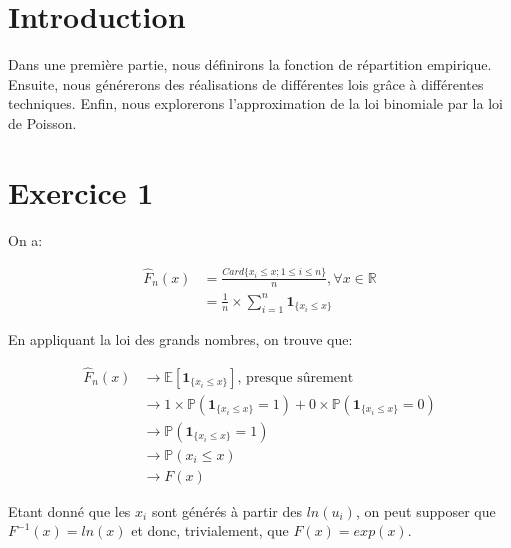 \documentclass{article}
\begin{document}
\begin{multicols}{2}

\section{Introduction}\label{sec:intro}

Dans une première partie, nous définirons la fonction de répartition empirique.
Ensuite, nous générerons des réalisations de différentes lois grâce à
différentes techniques. Enfin, nous explorerons l'approximation de la loi
binomiale par la loi de Poisson.


\section{Exercice 1}\label{sec:ex1}

On a:

\begin{equation}
    \begin{split}
        \hat{F}_n(x) &= \frac{Card\{x_i \leq x; 1 \leq i \leq n\}}{n}, \forall x \in \mathbb{R} \\
                     &= \frac{1}{n} \times \sum_{i = 1}^{n} \mathbf{1}_{\{x_i \leq x\}}
    \end{split}
\end{equation}

En appliquant la loi des grands nombres, on trouve que:

\begin{equation}
    \begin{split}
        \hat{F}_n(x) &\to \mathbb{E}[\mathbf{1}_{\{x_i \leq x\}}]\text{, presque sûrement}\\
                     &\to 1 \times \mathbb{P}(\mathbf{1}_{\{x_i \leq x\}} = 1) + 0 \times \mathbb{P}(\mathbf{1}_{\{x_i \leq x\}} = 0)\\
                     &\to \mathbb{P}(\mathbf{1}_{\{x_i \leq x\}} = 1)\\
                     &\to \mathbb{P}(x_i \leq x)\\
                     &\to F(x)
    \end{split}
\end{equation}

Etant donné que les $x_i$ sont générés à partir des $ln(u_i)$, on peut supposer
que $F^{-1}(x) = ln(x)$ et donc, trivialement, que $F(x) = exp(x)$.


\end{multicols}
\end{document}
